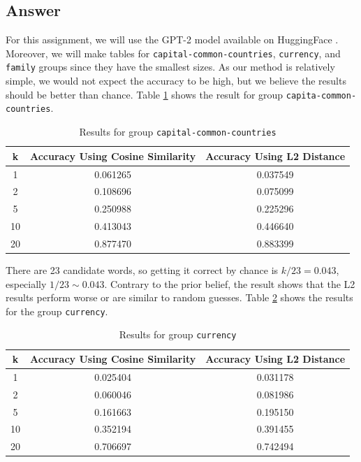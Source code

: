 \documentclass[
	12pt, %
]{../Template/fphw}
\begin{document}
\subsection*{Answer} For this assignment, we will use the GPT-2 model available on HuggingFace \cite{hf_canonical_model_maintainers_2022}. Moreover, we will make tables for \texttt{capital-common-countries}, 
\texttt{currency}, and \texttt{family} groups since they have the smallest sizes. As our method is relatively simple, we would not expect the accuracy to be high, but we believe the results should be better than chance.  Table \ref{tab: capital-common-countries} shows the result for group \texttt{capita-common-countries}.
\begin{table}[H]
\centering
\begin{tabular}{ccc}
\hline
\textbf{k} & \textbf{Accuracy Using Cosine Similarity} & \textbf{Accuracy Using L2 Distance} \\
\hline
1 & 0.061265 & 0.037549 \\
2 & 0.108696 & 0.075099 \\
5 & 0.250988 & 0.225296 \\
10 & 0.413043 & 0.446640 \\
20 & 0.877470 & 0.883399 \\
\hline
\end{tabular}
\caption{Results for group \texttt{capital-common-countries}}
\label{tab: capital-common-countries}
\end{table}

There are 23 candidate words, so getting it correct by chance is $k/23=0.043$, especially $1/23\sim 0.043$. Contrary to the prior belief, the result shows that the L2 results perform worse or are similar to random guesses. Table \ref{tab: currency} shows the results for the group
\texttt{currency}.

\begin{table}[H]
\centering
\begin{tabular}{ccc}
\hline
\textbf{k} & \textbf{Accuracy Using Cosine Similarity} & \textbf{Accuracy Using L2 Distance} \\
\hline
1 & 0.025404 & 0.031178 \\
2 & 0.060046 & 0.081986 \\
5 & 0.161663 & 0.195150 \\
10 & 0.352194 & 0.391455 \\
20 & 0.706697 & 0.742494 \\
\hline
\end{tabular}
\caption{Results for group \texttt{currency}}
\label{tab: currency}
\end{table}
\end{document}
